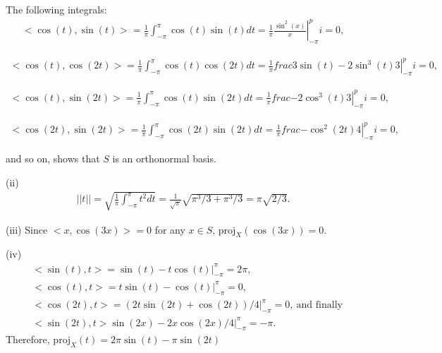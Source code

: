 \documentclass[11.5pt, letterpaper, bibtotoc,
    tablecaptionabove, figurecaptionabove]{article}
\begin{document}
The following integrals:
\begin{align*}
    <\cos(t),\sin(t)> = \frac{1}{\pi}\int_{-\pi}^\pi\cos(t)\sin(t)dt=
    \frac{1}{\pi}\left.\frac{\sin^2(x)}{x}\right\lvert_{-\pi}^pi=0,
\end{align*}

\begin{align*}
    <\cos(t),\cos(2t)> = \frac{1}{\pi}\int_{-\pi}^\pi\cos(t)\cos(2t)dt=
    \frac{1}{\pi}\left.frac{3\sin(t)-2\sin^3(t)}{3}\right\lvert_{-\pi}^pi=0,
\end{align*}

\begin{align*}
    <\cos(t),\sin(2t)> = \frac{1}{\pi}\int_{-\pi}^\pi\cos(t)\sin(2t)dt=
    \frac{1}{\pi}\left.frac{-2\cos^3(t)}{3}\right\lvert_{-\pi}^pi=0,
\end{align*}

\begin{align*}
    <\cos(2t),\sin(2t)> = \frac{1}{\pi}\int_{-\pi}^\pi\cos(2t)\sin(2t)dt=
    \frac{1}{\pi}\left.frac{-\cos^2(2t)}{4}\right\lvert_{-\pi}^pi=0,
\end{align*}

and so on, shows that $S$ is an orthonormal basis.

(ii)
\begin{align*}
    ||t|| = \sqrt{\frac{1}{\pi}\int_{-\pi}^\pi t^2dt}=
    \frac{1}{\sqrt{\pi}}\sqrt{\pi^3/3+\pi^3/3}=
    \pi\sqrt{2/3}.
\end{align*}

(iii)
Since $<x,\cos(3x)>=0$ for any $x\in S$, $\text{proj}_X(\cos(3x))=0$.

(iv)
\begin{align*}
    &<\sin(t),t>=\sin(t)-t\cos(t)\lvert_{-\pi}^\pi=2\pi,\\
    &<\cos(t),t>=t\sin(t)-\cos(t)\lvert_{-\pi}^\pi=0,\\
    &<\cos(2t),t>=(2t\sin(2t)+\cos(2t))/4\lvert_{-\pi}^\pi=0,\ \text{and finally}\\
    &<\sin(2t),t>\sin\left(2x\right)-2x\cos\left(2x\right)/4\lvert_{-\pi}^\pi=-\pi.
\end{align*}
Therefore, $\text{proj}_X(t)=2\pi\sin(t)-\pi\sin(2t)$
\end{document}
